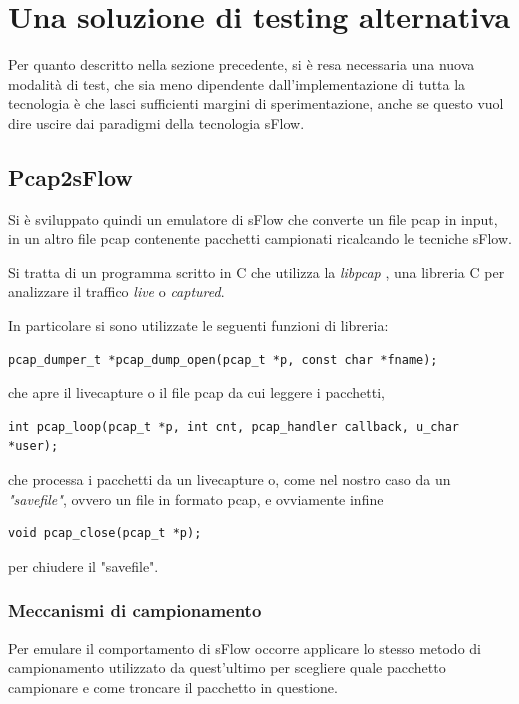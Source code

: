 \documentclass[12pt,a4paper,openright,twoside]{report}
\begin{document}
\section{Una soluzione di testing alternativa}


Per quanto descritto nella sezione precedente, si \`e resa necessaria
una nuova modalit\`a di test, che sia meno dipendente dall'implementazione
di tutta la tecnologia \`e che lasci sufficienti margini di sperimentazione,
anche se questo vuol dire uscire dai paradigmi della tecnologia sFlow.


\subsection{Pcap2sFlow}

Si \`e sviluppato quindi un emulatore di sFlow che converte un file pcap in input,
in un altro file pcap contenente pacchetti campionati ricalcando le tecniche sFlow.

Si tratta di un programma scritto in C che utilizza la {\it libpcap } \cite{EXP7},
una libreria C per analizzare il traffico {\it live} o {\it captured}.

In particolare si sono utilizzate le seguenti funzioni di libreria:
\begin{verbatim}
pcap_dumper_t *pcap_dump_open(pcap_t *p, const char *fname);
\end{verbatim}

che apre il livecapture o il file pcap da cui leggere i pacchetti,

\begin{verbatim}
int pcap_loop(pcap_t *p, int cnt, pcap_handler callback, u_char *user);
\end{verbatim}

che processa i pacchetti da un livecapture o, come nel nostro caso da un {\it "savefile"},
ovvero un file in formato pcap, e ovviamente infine

\begin{verbatim}
void pcap_close(pcap_t *p);
\end{verbatim}

per chiudere il "savefile".

\subsubsection{Meccanismi di campionamento}

Per emulare il comportamento di sFlow occorre applicare lo stesso metodo di campionamento
utilizzato da quest'ultimo per scegliere quale pacchetto campionare e come troncare il
pacchetto in questione.
\end{document}
